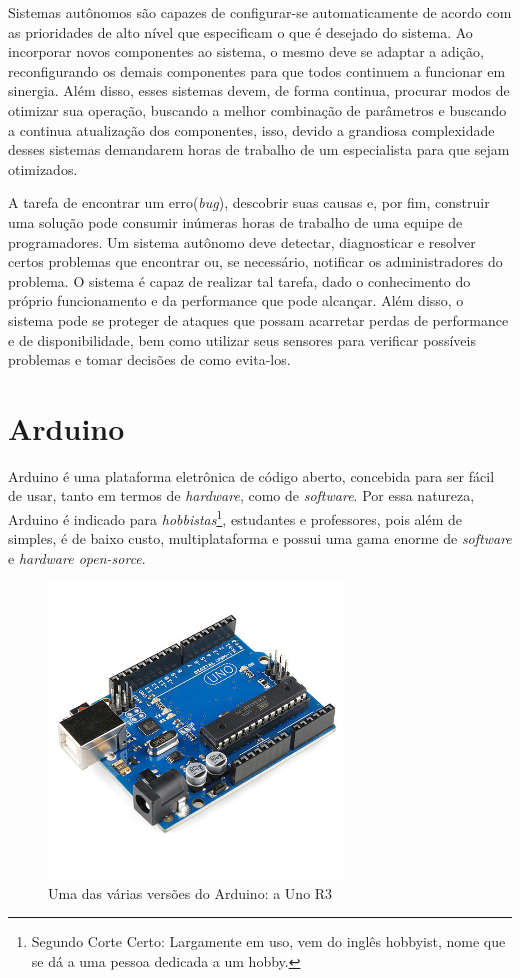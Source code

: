 Sistemas autônomos são capazes de configurar-se automaticamente de acordo com as prioridades de alto nível que especificam o que é desejado do sistema. Ao incorporar novos componentes ao sistema, o mesmo deve se adaptar a adição, reconfigurando os demais componentes para que todos continuem a funcionar em sinergia. Além disso, esses sistemas devem, de forma continua, procurar modos de otimizar sua operação, buscando a melhor combinação de parâmetros e buscando a continua atualização dos componentes, isso, devido a grandiosa complexidade desses sistemas demandarem horas de trabalho de um especialista para que sejam otimizados.

A tarefa de encontrar um erro(\textit{bug}), descobrir suas causas e, por fim, construir uma solução pode consumir inúmeras horas de trabalho de uma equipe de programadores. Um sistema autônomo deve detectar, diagnosticar e resolver certos problemas que encontrar ou, se necessário, notificar os administradores do problema. O sistema é capaz de realizar tal tarefa, dado o conhecimento do próprio funcionamento e da performance que pode alcançar. Além disso, o sistema pode se proteger de ataques que possam acarretar perdas de performance e de disponibilidade, bem como utilizar seus sensores para verificar possíveis problemas e tomar decisões de como evita-los.

\section{Arduino}
Arduino é uma plataforma eletrônica de código aberto,  concebida para ser fácil de usar, tanto em termos de \textit{hardware}, como de \textit{software}. Por essa natureza, Arduino é indicado para \textit{hobbistas}\footnote{Segundo Corte Certo: Largamente em uso, vem do inglês hobbyist, nome que se dá a uma pessoa dedicada a um hobby.}, estudantes e professores, pois além de simples, é de baixo custo, multiplataforma e possui uma gama enorme de \textit{software} e \textit{hardware open-sorce}\cite{Mohammed2017}.

\begin{figure}[H]
    \centering
    \includegraphics[width=0.7\textwidth]{figuras/Arduino_Uno_R3.png}
    \caption{Uma das várias versões do Arduino: a Uno R3}
    \label{fig:arduino-uno}
\end{figure}

